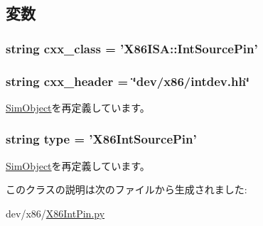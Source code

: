 \subsection{変数}
\hypertarget{classX86IntPin_1_1X86IntSourcePin_a58cd55cd4023648e138237cfc0822ae3}{
\subsubsection[{cxx\_\-class}]{\setlength{\rightskip}{0pt plus 5cm}string {\bf cxx\_\-class} = '{\bf X86ISA::IntSourcePin}'}}
\label{classX86IntPin_1_1X86IntSourcePin_a58cd55cd4023648e138237cfc0822ae3}
\hypertarget{classX86IntPin_1_1X86IntSourcePin_a17da7064bc5c518791f0c891eff05fda}{
\subsubsection[{cxx\_\-header}]{\setlength{\rightskip}{0pt plus 5cm}string {\bf cxx\_\-header} = \char`\"{}dev/x86/intdev.hh\char`\"{}}}
\label{classX86IntPin_1_1X86IntSourcePin_a17da7064bc5c518791f0c891eff05fda}


\hyperlink{classm5_1_1SimObject_1_1SimObject_a17da7064bc5c518791f0c891eff05fda}{SimObject}を再定義しています。\hypertarget{classX86IntPin_1_1X86IntSourcePin_acce15679d830831b0bbe8ebc2a60b2ca}{
\subsubsection[{type}]{\setlength{\rightskip}{0pt plus 5cm}string {\bf type} = '{\bf X86IntSourcePin}'}}
\label{classX86IntPin_1_1X86IntSourcePin_acce15679d830831b0bbe8ebc2a60b2ca}


\hyperlink{classm5_1_1SimObject_1_1SimObject_acce15679d830831b0bbe8ebc2a60b2ca}{SimObject}を再定義しています。

このクラスの説明は次のファイルから生成されました:\begin{DoxyCompactItemize}
\item 
dev/x86/\hyperlink{X86IntPin_8py}{X86IntPin.py}\end{DoxyCompactItemize}
